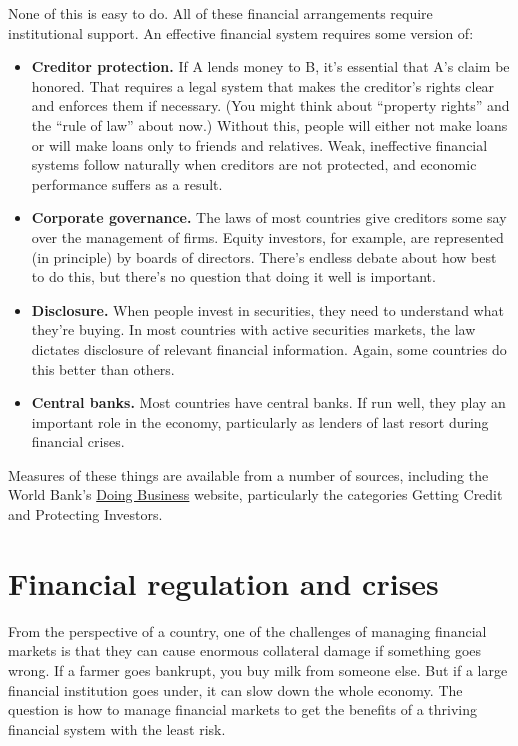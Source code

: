 None of this is easy to do.
All of these financial arrangements
require institutional support.
An effective financial system requires some version of:
%
\begin{itemize}
\item\textbf{Creditor protection.}
If A lends money to B, it's essential that A's claim be honored.
That requires a legal system that makes
the creditor's rights clear and enforces them if necessary.
(You might think about ``property rights'' and the ``rule of law''
about now.)
Without this, people will either not make loans or will make loans only to friends and relatives.
Weak, ineffective financial systems follow naturally
when creditors are not protected,
and economic performance suffers as a result.

\item \textbf{Corporate governance.}
The laws of most countries give creditors some
say over the management of firms.
Equity investors, for example,
are represented (in principle) by boards of directors.
There's endless debate about how best to do this,
but there's no question that doing it well is important.

\item \textbf{Disclosure.}
When people invest in securities, they need to understand what
they're buying.
In most countries with active securities markets,
the law dictates disclosure of relevant financial information.
Again, some countries do this better than others.

\item \textbf{Central banks.}
Most countries have central banks.
If run well, they play an important role in the economy,
particularly as lenders of last resort during financial crises.
\end{itemize}
%
Measures of these things are available from a number
of sources,
including the World Bank's
\href{http://www.doingbusiness.org/}{Doing Business}
website,
particularly the categories Getting Credit and Protecting Investors.


\section{Financial regulation and crises}

From the perspective of a country, one of
the challenges of managing financial markets is that they
can cause enormous collateral damage if something goes wrong.
If a farmer goes bankrupt, you buy milk from someone else.
But if a large financial institution goes under,
it can slow down the whole economy.
The question is how to manage financial markets to get the benefits
of a thriving financial system with the least risk.

